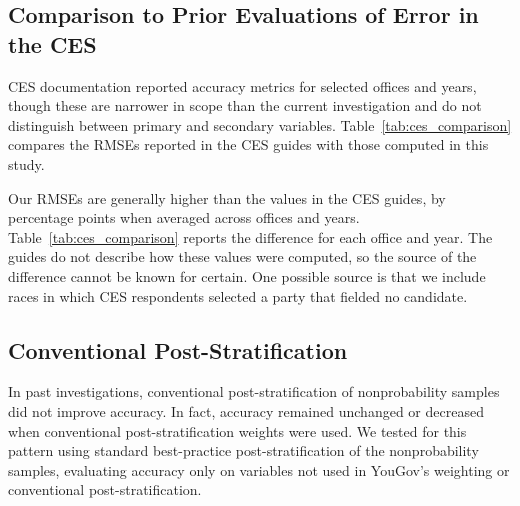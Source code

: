 \documentclass[12pt]{article}
\begin{document}
\subsection{Comparison to Prior Evaluations of Error in the CES}

CES documentation reported accuracy metrics for selected offices and years, though these are narrower in scope than the current investigation and do not distinguish between primary and secondary variables. Table~\ref{tab:ces_comparison} compares the RMSEs reported in the CES guides with those computed in this study.



Our RMSEs are generally higher than the values in the CES guides, by \GuideGapOverall{} percentage points when averaged across offices and years. Table~\ref{tab:ces_comparison} reports the difference for each office and year. The guides do not describe how these values were computed, so the source of the difference cannot be known for certain. One possible source is that we include races in which CES respondents selected a party that fielded no candidate.

% 

\subsection{Conventional Post-Stratification}
In past investigations, conventional post-stratification of nonprobability samples did not improve accuracy. In fact, accuracy remained unchanged or decreased when conventional post-stratification weights were used. We tested for this pattern using standard best-practice post-stratification of the nonprobability samples, evaluating accuracy only on variables not used in YouGov's weighting or conventional post-stratification.
\end{document}
